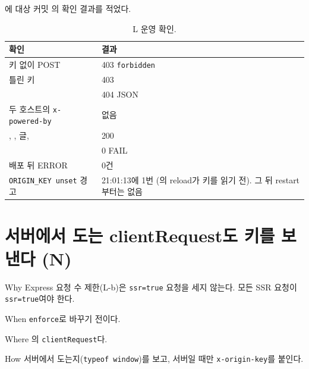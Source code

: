 에 대상 커밋 의 확인 결과를 적었다.

\begin{table}[H]
  \caption{L 운영 확인.}\label{tab:05-originkey-verify}
  \small
  \begin{tabularx}{\linewidth}{L{6.4cm} Y}
    \toprule
    확인 & 결과 \\
    \midrule
    키 없이 POST & 403 \texttt{forbidden} \\
    \midrule
    틀린 키 & 403 \\
    \midrule
     & 404 JSON \\
    \midrule
    두 호스트의 \texttt{x-powered-by} & 없음 \\
    \midrule
    \code{/}, , 글,  & 200 \\
    \midrule
     & 0 FAIL \\
    \midrule
    배포 뒤 ERROR & 0건 \\
    \midrule
    \texttt{ORIGIN\_KEY unset} 경고 & 21:01:13에 1번 (의 reload가 키를 읽기 전). 그 뒤 restart부터는 없음 \\
    \bottomrule
  \end{tabularx}
\end{table}

\section{서버에서 도는 clientRequest도 키를 보낸다 (N)}\label{sec:05-clientrequest}

\begin{inbrief}
  \item[Why] Express 요청 수 제한(L-b)은 \texttt{ssr=true} 요청을 세지 않는다. 모든 SSR 요청이 \texttt{ssr=true}여야 한다.
  \item[When] \texttt{enforce}로 바꾸기 전이다.
  \item[Where] 의 \texttt{clientRequest}다.
  \item[How] 서버에서 도는지(\texttt{typeof window})를 보고, 서버일 때만 \texttt{x-origin-key}를 붙인다.
\end{inbrief}

